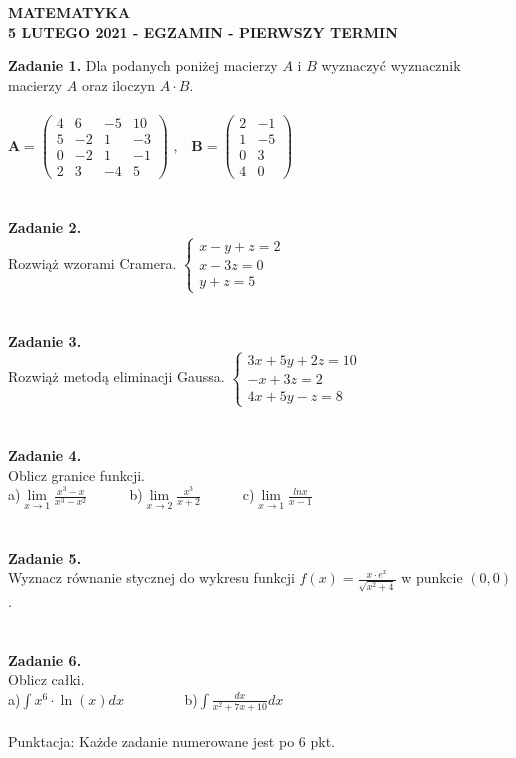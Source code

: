 \documentclass[12pt,a4paper]{report}
\begin{document}
\begin{center}

\textbf{MATEMATYKA \\5 LUTEGO 2021 - EGZAMIN - PIERWSZY TERMIN}

\end{center}\textbf{Zadanie 1.} Dla podanych poniżej macierzy $A$ i $B$ wyznaczyć wyznacznik macierzy $A$ oraz iloczyn $A\cdot B$. \\\\ $ \mathbf{A} = \left( \begin{array}{cccc} 4 & 6& -5 & 10\\5 & -2& 1 & -3\\0 & -2& 1 & -1\\2 & 3 & -4 & 5 \end{array} \right)$ ,\ \ $\mathbf{B} =\left( \begin{array}{cccc}2 & -1\\1 & -5\\0 & 3\\4 & 0  \end{array} \right)$\\\\\\\textbf{Zadanie 2.}  \\Rozwiąż wzorami Cramera. $\left\{ \begin{array}{ll}x-y+z=2\\x-3z=0\\y+z=5\end{array}\right.$\\\\\\\textbf{Zadanie 3.} \\Rozwiąż metodą eliminacji Gaussa. $\left\{ \begin{array}{ll}3x+5y+2z=10\\-x+3z=2\\4x+5y-z=8\end{array} \right.$\\\\\\\textbf{Zadanie 4.}\\Oblicz granice funkcji.\\a)$\lim\limits_{x\to 1}\frac{x^3-x}{x^3-x^2}$\ \ \ \ \ \  b)$\lim\limits_{x\to 2}\frac{x^3}{x+2}$\ \ \ \ \ \ c)$\lim\limits_{x\to 1} \frac{lnx}{x-1}$\\\\\\\textbf{Zadanie 5.} \\Wyznacz równanie stycznej do wykresu funkcji $f(x)=\frac{x\cdot e^x}{\sqrt{x^2+4}}$ w punkcie $(0,0)$.\\\\\\\textbf{Zadanie 6.}\\Oblicz całki. \\a)$\int x^6\cdot \ln(x) dx$ \ \ \ \ \ \ \ \ b)$\int \frac{dx}{x^2+7x+10} dx$\\\\Punktacja: Każde zadanie numerowane jest po 6 pkt.
\end{document}

